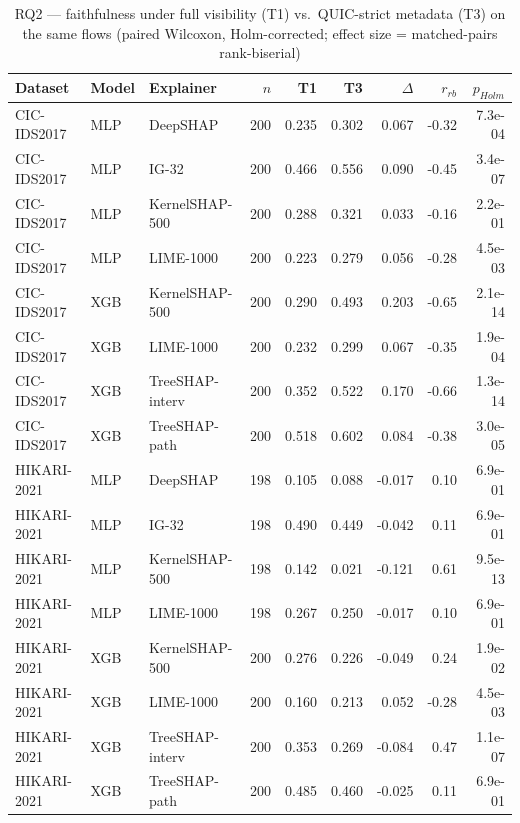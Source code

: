 \begin{table}[!htbp]
\centering
\caption{RQ2 --- faithfulness under full visibility (T1) vs.\ QUIC-strict metadata (T3) on the same flows (paired Wilcoxon, Holm-corrected; effect size = matched-pairs rank-biserial)}
\label{tab:tiertests}
\scriptsize
\setlength{\tabcolsep}{3.5pt}
\begin{tabular}{lllrrrrrr}
\toprule
\textbf{Dataset} & \textbf{Model} & \textbf{Explainer} & \textbf{$n$} & \textbf{T1} & \textbf{T3} & \textbf{$\Delta$} & \textbf{$r_{rb}$} & \textbf{$p_{Holm}$} \\
\midrule
CIC-IDS2017 & MLP & DeepSHAP & 200 & 0.235 & 0.302 & 0.067 & -0.32 & 7.3e-04 \\
CIC-IDS2017 & MLP & IG-32 & 200 & 0.466 & 0.556 & 0.090 & -0.45 & 3.4e-07 \\
CIC-IDS2017 & MLP & KernelSHAP-500 & 200 & 0.288 & 0.321 & 0.033 & -0.16 & 2.2e-01 \\
CIC-IDS2017 & MLP & LIME-1000 & 200 & 0.223 & 0.279 & 0.056 & -0.28 & 4.5e-03 \\
CIC-IDS2017 & XGB & KernelSHAP-500 & 200 & 0.290 & 0.493 & 0.203 & -0.65 & 2.1e-14 \\
CIC-IDS2017 & XGB & LIME-1000 & 200 & 0.232 & 0.299 & 0.067 & -0.35 & 1.9e-04 \\
CIC-IDS2017 & XGB & TreeSHAP-interv & 200 & 0.352 & 0.522 & 0.170 & -0.66 & 1.3e-14 \\
CIC-IDS2017 & XGB & TreeSHAP-path & 200 & 0.518 & 0.602 & 0.084 & -0.38 & 3.0e-05 \\
HIKARI-2021 & MLP & DeepSHAP & 198 & 0.105 & 0.088 & -0.017 & 0.10 & 6.9e-01 \\
HIKARI-2021 & MLP & IG-32 & 198 & 0.490 & 0.449 & -0.042 & 0.11 & 6.9e-01 \\
HIKARI-2021 & MLP & KernelSHAP-500 & 198 & 0.142 & 0.021 & -0.121 & 0.61 & 9.5e-13 \\
HIKARI-2021 & MLP & LIME-1000 & 198 & 0.267 & 0.250 & -0.017 & 0.10 & 6.9e-01 \\
HIKARI-2021 & XGB & KernelSHAP-500 & 200 & 0.276 & 0.226 & -0.049 & 0.24 & 1.9e-02 \\
HIKARI-2021 & XGB & LIME-1000 & 200 & 0.160 & 0.213 & 0.052 & -0.28 & 4.5e-03 \\
HIKARI-2021 & XGB & TreeSHAP-interv & 200 & 0.353 & 0.269 & -0.084 & 0.47 & 1.1e-07 \\
HIKARI-2021 & XGB & TreeSHAP-path & 200 & 0.485 & 0.460 & -0.025 & 0.11 & 6.9e-01 \\
\bottomrule
\end{tabular}
\end{table}

